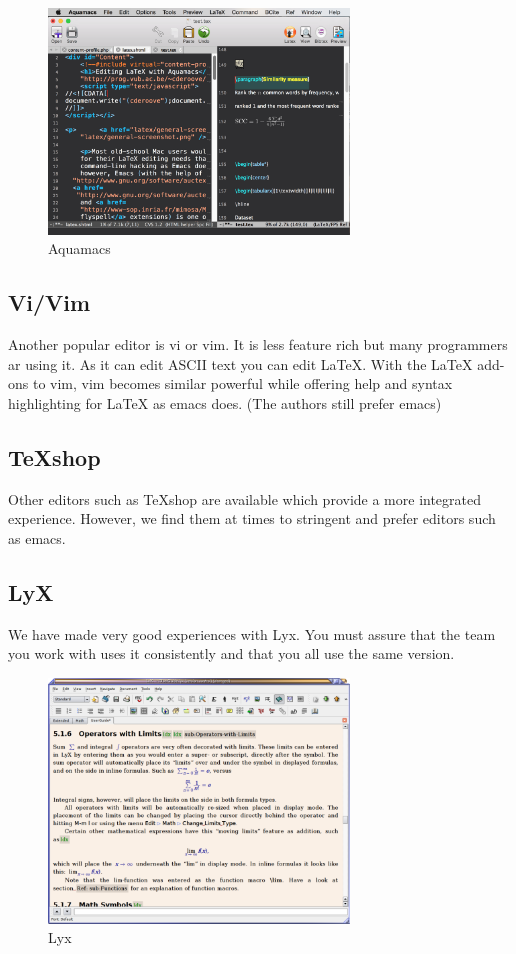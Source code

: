 \begin{figure}[!htb]
  \centering\includegraphics[width=8cm]{images/aquamacs.png}
  \caption{Aquamacs}
  \label{F:aquamacs}
\end{figure}


\subsection{Vi/Vim}\label{vivim}

Another popular editor is vi or vim. It is less feature rich but many
programmers ar using it. As it can edit ASCII text you can edit LaTeX.
With the LaTeX add-ons to vim, vim becomes similar powerful while
offering help and syntax highlighting for LaTeX as emacs does. (The
authors still prefer emacs)

\subsection{TeXshop}\label{texshop}

Other editors such as TeXshop are available which provide a more
integrated experience. However, we find them at times to stringent and
prefer editors such as emacs.

\subsection{LyX}\label{lyx}

We have made very good experiences with Lyx. You must assure that the
team you work with uses it consistently and that you all use the same
version.

\begin{figure}[!htb]
  \centering\includegraphics[width=8cm]{images/lyx.png}
  \caption{Lyx}
  \label{F:lyx}
\end{figure}

